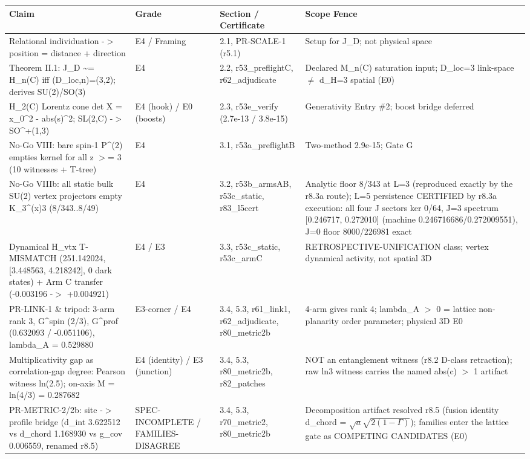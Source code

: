 \documentclass[11pt,a4paper]{article}
\theoremstyle{definition}
\begin{document}
\begin{center}
\small
\begin{tabularx}{\linewidth}{l X X X}
\toprule
\textbf{Claim} & \textbf{Grade} & \textbf{Section / Certificate} & \textbf{Scope Fence} \\ \midrule
Relational individuation -$>$ position = distance + direction & E4 / Framing & 2.1, PR-SCALE-1 (r5.1) & Setup for J\_D; not physical space \\
Theorem II.1: J\_D \textasciitilde{}= H\_n(C) iff (D\_loc,n)=(3,2); derives SU(2)/SO(3) & E4 & 2.2, r53\_preflightC, r62\_adjudicate & Declared M\_n(C) saturation input; D\_loc=3 link-space $\neq$ d\_H=3 spatial (E0) \\
H\_2(C) Lorentz cone det X = x\_0\^{}2 - abs(s)\^{}2; SL(2,C) -$>$ SO\^{}+(1,3) & E4 (hook) / E0 (boosts) & 2.3, r53e\_verify (2.7e-13 / 3.8e-15) & Generativity Entry \#2; boost bridge deferred \\
No-Go VIII: bare spin-1 P\^{}(2) empties kernel for all z $>$= 3 (10 witnesses + T-tree) & E4 & 3.1, r53a\_preflightB & Two-method 2.9e-15; Gate G \\
No-Go VIIIb: all static bulk SU(2) vertex projectors empty K\_3\^{}{(x)3} (8/343..8/49) & E4 & 3.2, r53b\_armsAB, r53c\_static, r83\_l5cert & Analytic floor 8/343 at L=3 (reproduced exactly by the r8.3a route); L=5 persistence CERTIFIED by r8.3a execution: all four J sectors ker 0/64, J=3 spectrum [0.246717, 0.272010] (machine 0.246716686/0.272009551), J=0 floor 8000/226981 exact \\
Dynamical H\_vtx T-MISMATCH (251.142024, [3.448563, 4.218242], 0 dark states) + Arm C transfer (-0.003196 -$>$ +0.004921) & E4 / E3 & 3.3, r53c\_static, r53c\_armC & RETROSPECTIVE-UNIFICATION class; vertex dynamical activity, not spatial 3D \\
PR-LINK-1 \& tripod: 3-arm rank 3, G\^{}spin (2/3), G\^{}prof (0.632093 / -0.051106), lambda\_A = 0.529880 & E3-corner / E4 & 3.4, 5.3, r61\_link1, r62\_adjudicate, r80\_metric2b & 4-arm gives rank 4; lambda\_A $>$ 0 = lattice non-planarity order parameter; physical 3D E0 \\
Multiplicativity gap as correlation-gap degree: Pearson witness ln(2.5); on-axis M = ln(4/3) = 0.287682 & E4 (identity) / E3 (junction) & 3.4, 5.3, r80\_metric2b, r82\_patches & NOT an entanglement witness (r8.2 D-class retraction); raw ln3 witness carries the named abs(c) $>$ 1 artifact \\
PR-METRIC-2/2b: site -$>$ profile bridge (d\_int 3.622512 vs d\_chord 1.168930 vs g\_cov 0.006559, renamed r8.5) & SPEC-INCOMPLETE / FAMILIES-DISAGREE & 3.4, 5.3, r70\_metric2, r80\_metric2b & Decomposition artifact resolved r8.5 (fusion identity d\_chord = $\sqrt{a}\sqrt{2(1-\Gamma)}$); families enter the lattice gate as COMPETING CANDIDATES (E0) \\

\end{tabularx}
\end{center}
\end{document}

